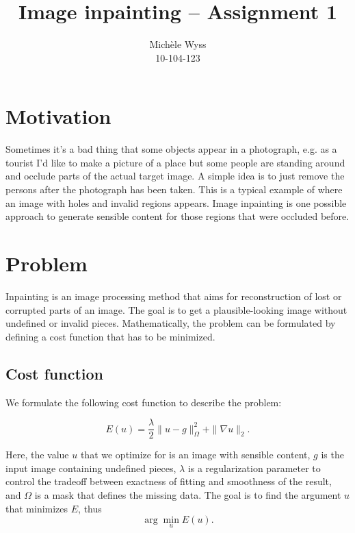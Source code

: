 \documentclass{paper}
\title{Image inpainting -- Assignment 1}
\author{Mich\`{e}le Wyss\\10-104-123}
\begin{document}
\maketitle


%

\section*{Motivation}
Sometimes it's a bad thing that some objects appear in a photograph, e.g. as a tourist I'd like to make a picture of a place but some people are standing around and occlude parts of the actual target image. A simple idea is to just remove the persons after the photograph has been taken. This is a typical example of where an image with holes and invalid regions appears. Image inpainting is one possible approach to generate sensible content for those regions that were occluded before.

\section*{Problem}
Inpainting is an image processing method that aims for reconstruction of lost or corrupted parts of an image. The goal is to get a plausible-looking image without undefined or invalid pieces. Mathematically, the problem can be formulated by defining a cost function that has to be minimized. 
\subsection*{Cost function}
We formulate the following cost function to describe the problem:

$$E(u) = \frac{\lambda}{2} \|u-g\|_\Omega^2 + \|\nabla u \|_2.$$

Here, the value $u$ that we optimize for is an image with sensible content, $g$ is the input image containing undefined pieces, $\lambda$ is a regularization parameter to control the tradeoff between exactness of fitting and smoothness of the result, and $\Omega$ is a mask that defines the missing data. The goal is to find the argument $u$ that minimizes $E$, thus
$$\arg \min_u E(u).$$
\end{document}
